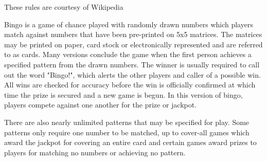 \label{sec:bingorules}

These rules are courtesy of Wikipedia\cite{website:bingo rules} %

Bingo is a game of chance played with randomly drawn numbers which players match against numbers that have been pre-printed on 5x5 matrices. The matrices may be printed on paper, card stock or electronically represented and are referred to as cards. Many versions conclude the game when the first person achieves a specified pattern from the drawn numbers. The winner is usually required to call out the word "Bingo!", which alerts the other players and caller of a possible win. All wins are checked for accuracy before the win is officially confirmed at which time the prize is secured and a new game is begun. In this version of bingo, players compete against one another for the prize or jackpot.

There are also nearly unlimited patterns that may be specified for play. Some patterns only require one number to be matched, up to cover-all games which award the jackpot for covering an entire card and certain games award prizes to players for matching no numbers or achieving no pattern.


